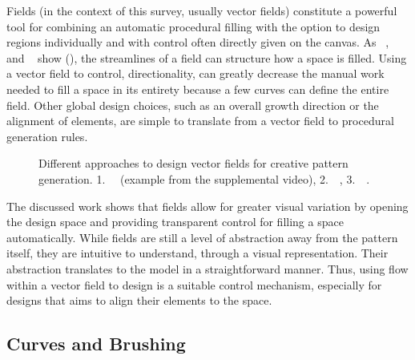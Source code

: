 Fields (in the context of this survey, usually vector fields) constitute a powerful tool for combining an automatic procedural filling with the option to design regions individually and with control often directly given on the canvas. As \citeauthor*{hsu_2020_aef}~\cite{hsu_2020_aef}, ~\citeauthor*{saputra_2017_ffo}~\cite{saputra_2017_ffo} and \citeauthor*{gieseke_2017_ooo}~\cite{gieseke_2017_ooo} show (), the streamlines of a field can structure how a space is filled. Using a vector field to control, \eg directionality, can greatly decrease the manual work needed to fill a space in its entirety because a few curves can define the entire field. Other global design choices, such as an overall growth direction or the alignment of elements, are simple to translate from a vector field to procedural generation rules.

\begin{figure}
    \centering
    \caption{\label{fig:fields}Different approaches to design vector fields for creative pattern generation. 1.~\citeauthor*{gieseke_2017_ooo}~\cite{gieseke_2017_ooo} (example from the supplemental video), 2.~\citeauthor*{hsu_2020_aef}~\cite{hsu_2020_aef}, 3.~\citeauthor*{saputra_2017_ffo}~\cite{saputra_2017_ffo}.}
\end{figure}

The discussed work shows that fields allow for greater visual variation by opening the design space and  providing transparent control for filling a space automatically. While fields are still a level of abstraction away from the pattern itself, they are intuitive to understand, \eg through a visual representation. Their abstraction translates to the model in a straightforward manner. Thus, using flow within a vector field to design is a suitable control mechanism, especially for designs that aims to align their elements to the space.


\subsection{Curves and Brushing}
\label{subsubsec:analysis_creative_means_curves}

